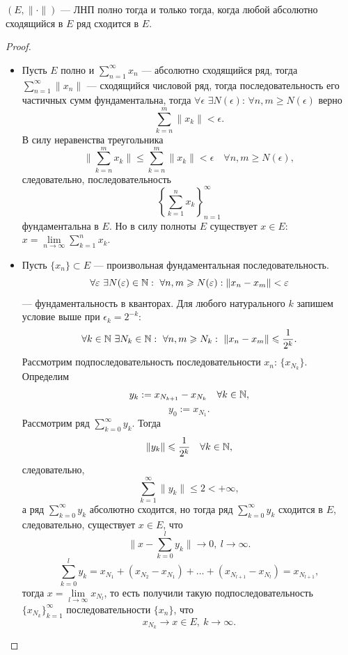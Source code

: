 \begin{theorem}
    $(E, \|\cdot\|)$ — ЛНП полно тогда и только тогда, когда любой абсолютно сходящийся в $E$ ряд сходится в $E$.
\end{theorem} 
\begin{proof}\tab
    \begin{itemize}
        \item[$\underline{\implies}$] 
    Пусть $E$ полно и $\sum\limits_{n=1}^{\infty}x_n$ — абсолютно сходящийся ряд, тогда $\sum\limits_{n=1}^{\infty}\|x_n\|$ — сходящийся числовой ряд, тогда последовательность его частичных сумм фундаментальна, тогда $\forall \epsilon$ $\exists N(\epsilon)$: $\forall n,m \geqslant N(\epsilon)$ верно 
    \[\sum\limits_{k=n}^{m}\|x_k\| < \epsilon.\]
    В силу неравенства треугольника
    \[\|\sum\limits_{k=n}^{m}x_k\| \leqslant \sum\limits_{k=n}^{m}\|x_k\| < \epsilon \quad \forall n,m \geqslant N(\epsilon),\]
    следовательно, последовательность
    \[\left\{\sum\limits_{k=1}^{n}x_k\right\}_{n=1}^\infty\]
    фундаментальна в $E$.
    Но в силу полноты $E$ существует $x \in E$: $x = \lim\limits_{n\to \infty} \sum\limits_{k=1}^{n}x_k$.
        \item[$\underline{\impliedby}$] 
    Пусть $\{x_n\} \subset E$ — произвольная фундаментальная последовательность.
    \[\forall \epsilon \ \exists N(\epsilon) \in \N: \ \forall n,m \geqslant N(\epsilon): \|x_n - x_m\| < \epsilon\]
    — фундаментальность в кванторах.
    Для любого натурального $k$ запишем условие выше при $\epsilon_k = 2^{-k}$:
    \[\forall k \in \N \ \exists N_k \in \N: \ \forall n,m \geqslant N_k: \ \|x_n - x_m\| \leqslant \frac{1}{2^k}.\]
    Рассмотрим подпоследовательность последовательности $x_n$: $\{x_{N_k}\}$.
    Определим
    \[y_k := x_{N_{k+1}} - x_{N_k} \quad \forall k \in \mathbb{N},\]
    \[y_0 := x_{N_1}.\]
    Рассмотрим ряд $\sum\limits_{k=0}^{\infty}y_k$. Тогда
    \[\|y_k\| \leqslant \frac{1}{2^k} \quad \forall k \in \mathbb{N},\]
    следовательно,
    \[\sum\limits_{k=1}^{\infty} \|y_k\| \leqslant 2 < +\infty,\]
    а ряд $\sum\limits_{k=0}^{\infty}y_k$ абсолютно сходится, но тогда ряд $\sum\limits_{k=0}^{\infty}y_k$ сходится в $E$, следовательно, существует $x \in E$, что
    \[\|x - \sum\limits_{k=0}^{l}y_k\| \to 0, \ l \to \infty.\]
    \[\sum\limits_{k=0}^{l} y_k = x_{N_1} + (x_{N_2} - x_{N_1}) + \dots + (x_{N_{l+1}} - x_{N_l}) = x_{N_{l+1}},\]
    тогда $x = \lim\limits_{l \to \infty} x_{N_l}$, то есть получили такую подпоследовательность $\{x_{N_k}\}_{k=1}^\infty$ последовательности $\{x_n\}$, что 
    $$x_{N_k} \to x \in E, \ k \to \infty.$$

\end{itemize}
\end{proof}
